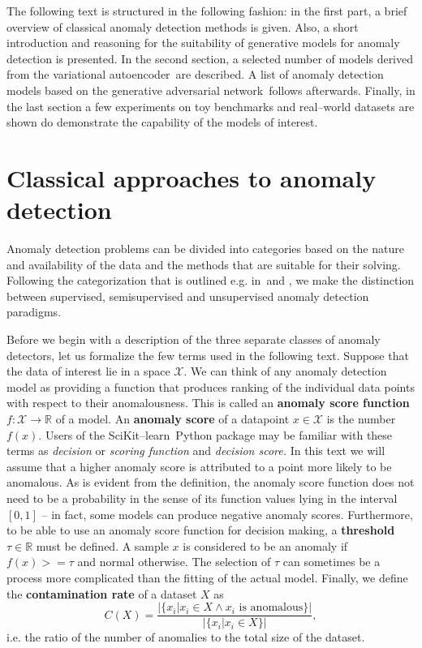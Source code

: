 The following text is structured in the following fashion: in the
first part, a brief overview of classical anomaly detection methods
is given. Also, a short introduction and reasoning for the suitability
of generative models for anomaly detection is presented. In the second
section, a selected number of models derived from the variational
autoencoder\,\cite{kingma2013vae} are described. A list of anomaly
detection models based on the generative adversarial network\,\cite{goodfellow2014gan}
follows afterwards. Finally, in the last section a few experiments
on toy benchmarks and real--world datasets are shown do demonstrate
the capability of the models of interest.

\section{Classical approaches to anomaly detection}

Anomaly detection problems can be divided into categories based on
the nature and availability of the data and the methods that are suitable
for their solving. Following the categorization that is outlined e.g.
in\,\cite{hodge2004survey} and \cite{goldstein2016comparative},
we make the distinction between supervised, semisupervised and unsupervised
anomaly detection paradigms.

Before we begin with a description of the three separate classes of
anomaly detectors, let us formalize the few terms used in the following
text. Suppose that the data of interest lie in a space $\mathcal{X}$.
We can think of any anomaly detection model as providing a function
that produces ranking of the individual data points with respect to
their anomalousness. This is called an \textbf{anomaly score function}
$f:\mathcal{X}\rightarrow\mathbb{R}$ of a model. An \textbf{anomaly
score} of a datapoint $x\in\mathcal{X}$ is the number $f(x)$. Users
of the SciKit--learn\,\cite{pedregosa2011scikit} Python package
may be familiar with these terms as \textit{decision }or \textit{scoring
function} and \textit{decision score.} In this text we will assume
that a higher anomaly score is attributed to a point more likely to
be anomalous. As is evident from the definition, the anomaly score
function does not need to be a probability in the sense of its function
values lying in the interval $\left[0,1\right]$ -- in fact, some
models can produce negative anomaly scores. Furthermore, to be able
to use an anomaly score function for decision making, a \textbf{threshold}
$\tau\in\mathbb{R}$ must be defined. A sample $x$ is considered
to be an anomaly if $f(x)>=\tau$ and normal otherwise. The selection
of $\tau$ can sometimes be a process more complicated than the fitting
of the actual model. Finally, we define the \textbf{contamination
rate }of a dataset $X$ as
\begin{equation}
C(X)=\frac{|\{x_{i}|x_{i}\in X\wedge x_{i}\text{ is anomalous}\}|}{|\{x_{i}|x_{i}\in X\}|},
\end{equation}
i.e. the ratio of the number of anomalies to the total size of the
dataset.

